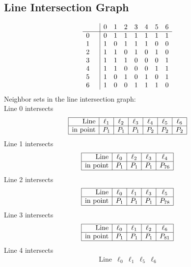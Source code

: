 \documentclass{article}
\begin{document}
{\subsection*{Line Intersection Graph}
{\arraycolsep=1pt
$$
\begin{array}{rr|*{7}r}
 &  & 0 & 1 & 2 & 3 & 4 & 5 & 6\\
\hline
0 &  & 0 & 1 & 1 & 1 & 1 & 1 & 1\\
1 &  & 1 & 0 & 1 & 1 & 1 & 0 & 0\\
2 &  & 1 & 1 & 0 & 1 & 0 & 1 & 0\\
3 &  & 1 & 1 & 1 & 0 & 0 & 0 & 1\\
4 &  & 1 & 1 & 0 & 0 & 0 & 1 & 1\\
5 &  & 1 & 0 & 1 & 0 & 1 & 0 & 1\\
6 &  & 1 & 0 & 0 & 1 & 1 & 1 & 0\\
\end{array}
$$
}%
Neighbor sets in the line intersection graph:\\
Line 0 intersects 
$$
\begin{array}{|r*{6}{|c}|}
\hline
\mbox{Line}  & \ell_{1} & \ell_{2} & \ell_{3} & \ell_{4} & \ell_{5} & \ell_{6}\\
\hline
\mbox{in point}  & P_{1} & P_{1} & P_{1} & P_{2} & P_{2} & P_{2}\\
\hline
\end{array}
$$
Line 1 intersects 
$$
\begin{array}{|r*{4}{|c}|}
\hline
\mbox{Line}  & \ell_{0} & \ell_{2} & \ell_{3} & \ell_{4}\\
\hline
\mbox{in point}  & P_{1} & P_{1} & P_{1} & P_{76}\\
\hline
\end{array}
$$
Line 2 intersects 
$$
\begin{array}{|r*{4}{|c}|}
\hline
\mbox{Line}  & \ell_{0} & \ell_{1} & \ell_{3} & \ell_{5}\\
\hline
\mbox{in point}  & P_{1} & P_{1} & P_{1} & P_{78}\\
\hline
\end{array}
$$
Line 3 intersects 
$$
\begin{array}{|r*{4}{|c}|}
\hline
\mbox{Line}  & \ell_{0} & \ell_{1} & \ell_{2} & \ell_{6}\\
\hline
\mbox{in point}  & P_{1} & P_{1} & P_{1} & P_{81}\\
\hline
\end{array}
$$
Line 4 intersects 
$$
\begin{array}{|r*{4}{|c}|}
\hline
\mbox{Line}  & \ell_{0} & \ell_{1} & \ell_{5} & \ell_{6}\\

\end{array}$$}
\end{document}
